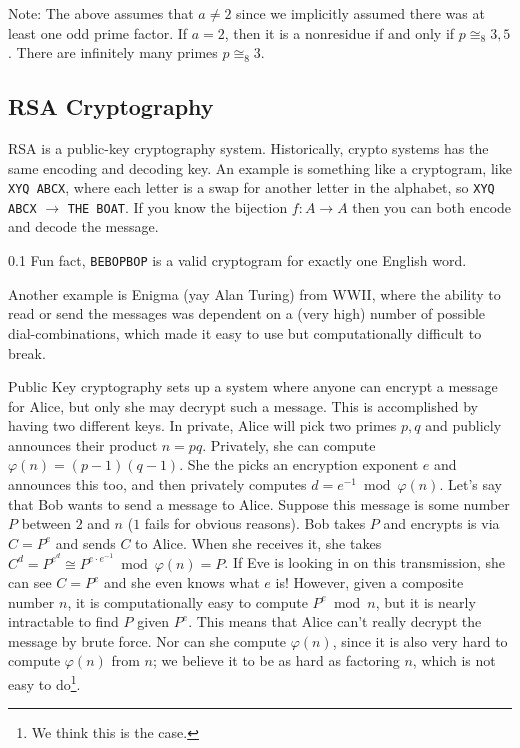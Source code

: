Note: The above assumes that $a \not= 2$ since we implicitly assumed there was at least one odd prime factor. If $a = 2$, then it is a nonresidue if and only if $p \cong_8 3,5$. There are infinitely many primes $p \cong_8 3$.

\subsection{RSA Cryptography}

RSA is a public-key cryptography system. Historically, crypto systems has the same encoding and decoding key. An example is something like a cryptogram, like \texttt{XYQ ABCX}, where each letter is a swap for another letter in the alphabet, so \texttt{XYQ ABCX} $\to$ \texttt{THE BOAT}. If you know the bijection $f\colon A \to A$ then you can both encode and decode the message.

0.1\textwidth
Fun fact, \texttt{BEBOPBOP} is a valid cryptogram for exactly one English word.

Another example is Enigma (yay Alan Turing) from WWII, where the ability to read or send the messages was dependent on a (very high) number of possible dial-combinations, which made it easy to use but computationally difficult to break.

Public Key cryptography sets up a system where anyone can encrypt a message for Alice, but only she may decrypt such a message. This is accomplished by having two different keys. In private, Alice will pick two primes $p,q$ and publicly announces their product $n = pq$. Privately, she can compute $\varphi(n) = (p-1)(q-1)$. She the picks an encryption exponent $e$ and announces this too, and then privately computes $d = e^{-1} \bmod \varphi(n)$. Let's say that Bob wants to send a message to Alice. Suppose this message is some number $P$ between $2$ and $n$ ($1$ fails for obvious reasons). Bob takes $P$ and encrypts is via $C = P^e$ and sends $C$ to Alice. When she receives it, she takes $C^d = P^{e^{d}} \cong P^{e \cdot e^{-1}} \bmod \varphi(n) = P$. If Eve is looking in on this transmission, she can see $C = P^e$ and she even knows what $e$ is! However, given a composite number $n$, it is computationally easy to compute $P^e \bmod n$, but it is nearly intractable to find $P$ given $P^e$. This means that Alice can't really decrypt the message by brute force. Nor can she compute $\varphi(n)$, since it is also very hard to compute $\varphi(n)$ from $n$; we believe it to be as hard as factoring $n$, which is not easy to do\footnote{We think this is the case.}.

